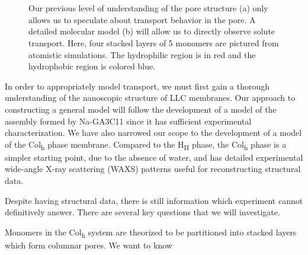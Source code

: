 \documentclass{article}
\begin{document}
\begin{figure}
\begin{subfigure}{0.45\linewidth}
		\caption{}~\label{fig:detailed_pore}
	\end{subfigure}
  \caption{Our previous level of understanding of the pore structure (a) only allows us to speculate
	   about transport behavior in the pore. A detailed molecular model (b) will allow us to
	   directly observe solute transport. Here, four stacked layers of 5 monomers
           are pictured from atomistic simulations. The hydrophilic region is in red and the 
	   hydrophobic region is colored blue.}~\label{fig:detail}
  \end{figure}
 
  In order to appropriately model transport, we must first gain a thorough
  understanding of the nanoscopic structure of LLC membranes. Our approach to
  constructing a general model will follow the development of a model of the
  assembly formed by Na-GA3C11 since it has sufficient experimental
  characterization. We have also narrowed our scope to the development of a model
  of the Col\textsubscript{h} phase membrane. Compared to the H\textsubscript{II}
  phase, the Col\textsubscript{h} phase is a simpler starting point, due to the
  absence of water, and has detailed experimental wide-angle X-ray scattering
  (WAXS) patterns useful for reconstructing structural data.  

  Despite having structural data, there is still information which experiment
  cannot definitively answer. There are several key questions that we will
  investigate.
 
  Monomers in the Col\textsubscript{h} system are theorized to be partitioned
  into stacked layers which form columnar pores. We want to know 
\end{document}
